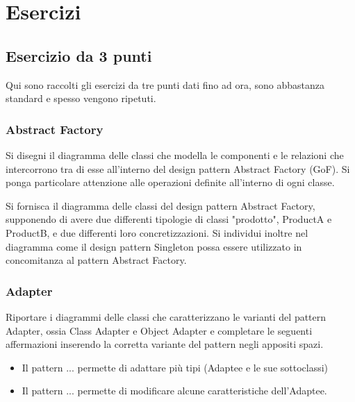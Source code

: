 \chapter{Esercizi}

\section{Esercizio da 3 punti}
Qui sono raccolti gli esercizi da tre punti dati fino ad ora, sono abbastanza standard e spesso vengono ripetuti.

\subsection{Abstract Factory}

Si disegni il diagramma delle classi che modella le componenti e le relazioni che intercorrono tra di esse all'interno del design pattern Abstract Factory (GoF). Si ponga particolare attenzione alle operazioni definite all'interno di ogni classe.

Si fornisca il diagramma delle classi del design pattern Abstract Factory, supponendo di avere due differenti tipologie di classi "prodotto", ProductA e ProductB, e due differenti loro concretizzazioni. Si individui inoltre nel diagramma come il design pattern Singleton possa essere utilizzato in concomitanza al pattern Abstract Factory.

\subsection{Adapter}

Riportare i diagrammi delle classi che caratterizzano le varianti del pattern Adapter, ossia Class Adapter e Object Adapter
e completare le seguenti affermazioni inserendo la corretta variante del pattern negli appositi spazi.
\begin{itemize}
\item Il pattern ... permette di adattare più tipi (Adaptee e le sue sottoclassi)
\item Il pattern ... permette di modificare alcune caratteristiche dell’Adaptee.
\end{itemize}

